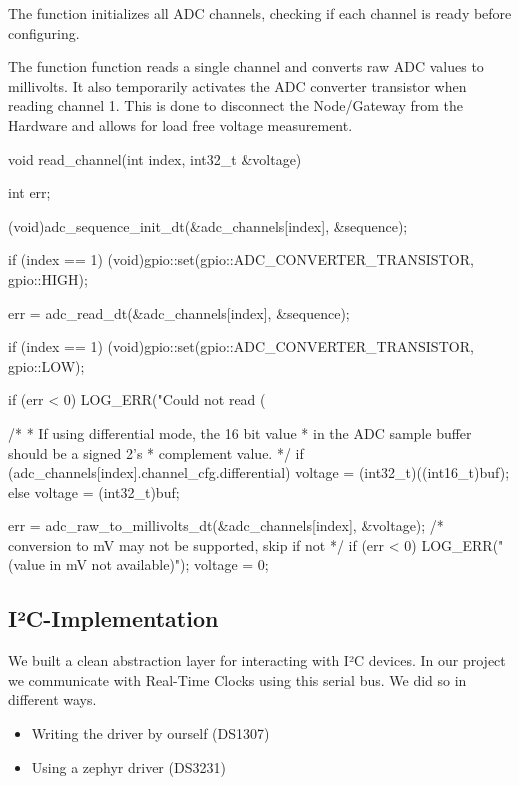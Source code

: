 The  function initializes all ADC channels, checking if each channel is ready before configuring. 

The function  function reads a single channel and converts raw ADC values to millivolts.
It also temporarily activates the ADC converter transistor when reading channel 1. 
This is done to disconnect the Node/Gateway from the Hardware and allows for load free voltage measurement.

\begin{cpp}[caption={Implementation of reading a analog voltage}]
void read_channel(int index, int32_t &voltage)
{
    int err;

    (void)adc_sequence_init_dt(&adc_channels[index], &sequence);

    if (index == 1)
    {
        (void)gpio::set(gpio::ADC_CONVERTER_TRANSISTOR, gpio::HIGH);
    }

    err = adc_read_dt(&adc_channels[index], &sequence);

    if (index == 1)
    {
        (void)gpio::set(gpio::ADC_CONVERTER_TRANSISTOR, gpio::LOW);
    }

    if (err < 0)
    {
        LOG_ERR("Could not read (%
    }

    /*
     * If using differential mode, the 16 bit value
     * in the ADC sample buffer should be a signed 2's
     * complement value.
     */
    if (adc_channels[index].channel_cfg.differential)
    {
        voltage = (int32_t)((int16_t)buf);
    }
    else
    {
        voltage = (int32_t)buf;
    }
    
    err = adc_raw_to_millivolts_dt(&adc_channels[index],
                                   &voltage);
    /* conversion to mV may not be supported, skip if not */
    if (err < 0)
    {
        LOG_ERR(" (value in mV not available)");
        voltage = 0;
    }
}
\end{cpp}

 
\subsection{I²C-Implementation}

We built a clean abstraction layer for interacting with I²C devices. In our project we communicate with Real-Time Clocks using this serial bus. We did so in different ways.

\begin{itemize}
    \item Writing the driver by ourself (DS1307)
    \item Using a zephyr driver (DS3231)
\end{itemize}


